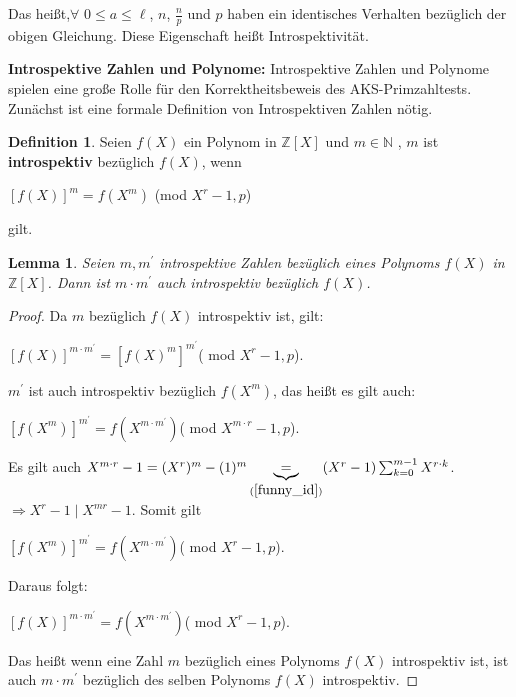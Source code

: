 \documentclass[12pt,oneside]{article}
\newtheorem{lemma}[theorem]{Lemma}
\theoremstyle{remark}
\theoremstyle{definition}
\newtheorem{definition}{Definition}[section]
\begin{document}
Das heißt,$\forall$ $0 \leq a \leq \ell$, $n$, $\frac{n}{p}$ und $p$ haben ein identisches Verhalten bezüglich der obigen Gleichung. Diese Eigenschaft heißt Introspektivität.\newline    


\textbf{Introspektive Zahlen und Polynome:}
Introspektive Zahlen und Polynome spielen eine große Rolle für den Korrektheitsbeweis des AKS-Primzahltests. Zunächst ist eine formale Definition von Introspektiven Zahlen nötig.

\begin{definition}
Seien $f(X)$ ein Polynom in $\mathbb{Z}[X]$ und $m \in \mathbb{N}$ , $m$ ist \textbf{introspektiv} bezüglich $f(X)$, wenn\newline\newline
    \centerline{$[f(X)]^{m} = f(X^m)$ (mod $X^r - 1,p$)} 
gilt. 
\end{definition}

\smallskip

\begin{lemma}\label{intros_num}
Seien $m,m^{'}$ introspektive Zahlen bezüglich eines Polynoms $f(X)$ in $\mathbb{Z}[X]$. Dann ist $m \cdot m^{'}$ auch introspektiv bezüglich $f(X)$.
\end{lemma}

\begin{proof}
Da $m$ bezüglich $f(X)$ introspektiv ist, gilt:\newline\newline
\centerline{$[f(X)]^{m \cdot m^{'}} = [f(X)^{m}]^{m^{'}}$( mod $X^r - 1, p$).}\newline\newline
$m^{'}$ ist auch introspektiv bezüglich $f(X^{m})$, das heißt es gilt auch:\newline\newline
\centerline{$[f(X^m)]^{m^{'}} = f(X^{m \cdot m^{'}})$( mod $X^{m\cdot r} - 1, p$).}\newline\newline

Es gilt auch $X^{m \cdot r } - 1 = (X^{r})^{m} - (1)^m \underbrace{=}_{(\ref{funny_id})} (X^{r} - 1) \sum_{k = 0}^{m-1} X^{r \cdot k}$.\newline\newline$\Rightarrow X^{r} - 1\mid X^{mr} - 1$. Somit gilt\newline\newline
\centerline{$[f(X^m)]^{m^{'}} = f(X^{m \cdot m^{'}})$( mod $X^{r} - 1,p$).}\newline

Daraus folgt:\newline\newline
\centerline{$[f(X)]^{m \cdot m^{'}} = f(X^{m \cdot m^{'}}) $( mod $X^r - 1, p$).}\newline

Das heißt wenn eine Zahl $m$ bezüglich eines Polynoms $f(X)$ introspektiv ist, ist auch $m \cdot m^{'}$ bezüglich des selben Polynoms $f(X)$ introspektiv. 
\end{proof}
\end{document}
